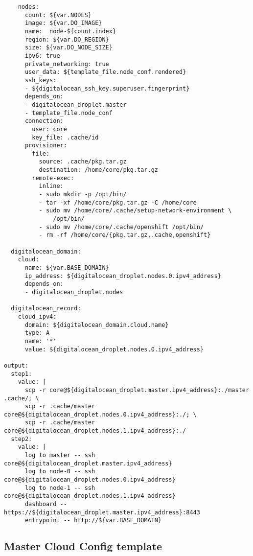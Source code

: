 \begin{verbatim}
    nodes:
      count: ${var.NODES}
      image: ${var.DO_IMAGE}
      name:  node-${count.index}
      region: ${var.DO_REGION}
      size: ${var.DO_NODE_SIZE}
      ipv6: true
      private_networking: true
      user_data: ${template_file.node_conf.rendered}
      ssh_keys:
      - ${digitalocean_ssh_key.superuser.fingerprint}
      depends_on:
      - digitalocean_droplet.master
      - template_file.node_conf
      connection:
        user: core
        key_file: .cache/id
      provisioner:
        file:
          source: .cache/pkg.tar.gz
          destination: /home/core/pkg.tar.gz
        remote-exec:
          inline:
          - sudo mkdir -p /opt/bin/
          - tar -xf /home/core/pkg.tar.gz -C /home/core
          - sudo mv /home/core/.cache/setup-network-environment \
              /opt/bin/
          - sudo mv /home/core/.cache/openshift /opt/bin/
          - rm -rf /home/core/{pkg.tar.gz,.cache,openshift}

  digitalocean_domain:
    cloud:
      name: ${var.BASE_DOMAIN}
      ip_address: ${digitalocean_droplet.nodes.0.ipv4_address}
      depends_on:
      - digitalocean_droplet.nodes

  digitalocean_record:
    cloud_ipv4:
      domain: ${digitalocean_domain.cloud.name}
      type: A
      name: '*'
      value: ${digitalocean_droplet.nodes.0.ipv4_address}

output:
  step1:
    value: |
      scp -r core@${digitalocean_droplet.master.ipv4_address}:./master .cache/; \
      scp -r .cache/master core@${digitalocean_droplet.nodes.0.ipv4_address}:./; \
      scp -r .cache/master core@${digitalocean_droplet.nodes.1.ipv4_address}:./
  step2:
    value: |
      log to master -- ssh core@${digitalocean_droplet.master.ipv4_address}
      log to node-0 -- ssh core@${digitalocean_droplet.nodes.0.ipv4_address}
      log to node-1 -- ssh core@${digitalocean_droplet.nodes.1.ipv4_address}
      dashboard -- https://${digitalocean_droplet.master.ipv4_address}:8443
      entrypoint -- http://${var.BASE_DOMAIN}
\end{verbatim}

\subsection{Master Cloud Config
template}\label{master-cloud-config-template}

